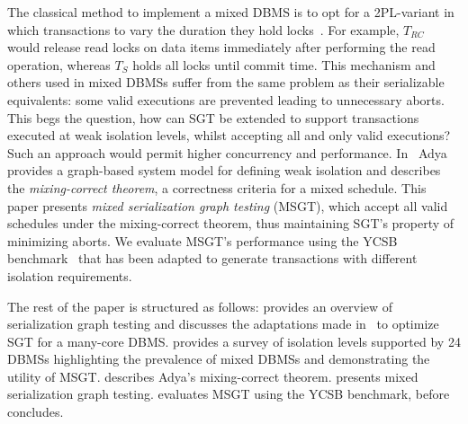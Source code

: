 The classical method to implement a mixed DBMS is to opt for a 2PL-variant in which 
transactions to vary the duration they hold locks~\cite{DBLP:conf/ds/GrayLPT76}. For 
example, $T_{RC}$ would release read locks on data items immediately after performing 
the read operation, whereas $T_S$  holds all locks until commit time. This mechanism
and others used in mixed DBMSs suffer from the same problem as their
serializable equivalents: some valid executions are prevented leading to unnecessary
aborts. This begs the question, how can SGT be extended to support transactions
executed at weak isolation levels, whilst accepting all and only valid executions? Such an approach
would permit higher concurrency and performance. In~\cite{adya1999weak} Adya provides a graph-based system model for defining weak isolation 
and describes the \emph{mixing-correct theorem}, a correctness criteria for a mixed schedule. 
This paper presents \emph{mixed serialization graph testing} (MSGT), which 
accept all valid schedules under the mixing-correct theorem, thus maintaining 
SGT's property of minimizing aborts. We evaluate MSGT's performance using the YCSB benchmark~\cite{DBLP:conf/cloud/CooperSTRS10} 
that has been adapted to generate transactions with different isolation 
requirements.

The rest of the paper is structured as follows:
 provides an overview of serialization graph testing 
and discusses the adaptations made in~\cite{DBLP:conf/icde/Durner019} to optimize SGT
for a many-core DBMS.
 provides a survey of isolation levels supported by 24 DBMSs highlighting the prevalence of mixed DBMSs and
demonstrating the utility of MSGT.
 describes Adya's mixing-correct theorem.
 presents mixed serialization graph testing.
 evaluates MSGT using the YCSB benchmark, before  concludes.
